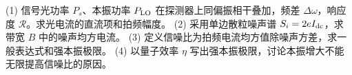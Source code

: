 (1) 信号光功率 \(P_s\)、本振功率 \(P_{\rm LO}\) 在探测器上同偏振相干叠加，频差 \(\Delta\omega\)，响应度 \(\mathcal R\)。求光电流的直流项和拍频幅度。
(2) 采用单边散粒噪声谱 \(S_i=2eI_{\rm dc}\)，求带宽 \(B\) 中的噪声均方电流。
(3) 定义信噪比为拍频电流均方值除噪声方差，求一般表达式和强本振极限。
(4) 以量子效率 \(\eta\) 写出强本振极限，讨论本振增大不能无限提高信噪比的原因。
